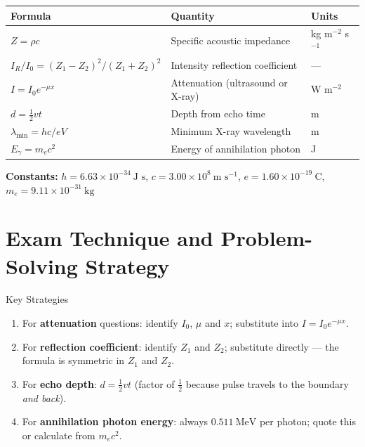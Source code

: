\begin{minipage}{\linewidth}
\begin{tcolorbox}[colback=lightgold, colframe=accentgold]
\renewcommand{\arraystretch}{1.8}
\begin{tabular}{@{}lll@{}}
\toprule
\textbf{Formula} & \textbf{Quantity} & \textbf{Units} \\
\midrule
$Z = \rho c$ & Specific acoustic impedance & kg m$^{-2}$ s$^{-1}$ \\
$I_R/I_0 = (Z_1-Z_2)^2/(Z_1+Z_2)^2$ & Intensity reflection coefficient & --- \\
$I = I_0 e^{-\mu x}$ & Attenuation (ultrasound or X-ray) & W m$^{-2}$ \\
$d = \tfrac{1}{2}vt$ & Depth from echo time & m \\
$\lambda_{\min} = hc/eV$ & Minimum X-ray wavelength & m \\
$E_\gamma = m_e c^2$ & Energy of annihilation photon & J \\
\bottomrule
\end{tabular}
\end{tcolorbox}

\vspace{0.5em}
\begin{tcolorbox}[colback=lightblue, colframe=darkblue]
\textbf{Constants:}\quad
$h = 6.63\times10^{-34}\ \text{J s}$,\quad
$c = 3.00\times10^8\ \text{m s}^{-1}$,\quad
$e = 1.60\times10^{-19}\ \text{C}$,\quad
$m_e = 9.11\times10^{-31}\ \text{kg}$
\end{tcolorbox}
\end{minipage}

\section{Exam Technique and Problem-Solving Strategy}

\begin{keybox}{Key Strategies}
\begin{enumerate}[itemsep=3pt]
  \item For \textbf{attenuation} questions: identify $I_0$, $\mu$ and $x$; substitute into $I = I_0 e^{-\mu x}$.
  \item For \textbf{reflection coefficient}: identify $Z_1$ and $Z_2$; substitute directly — the formula is symmetric in $Z_1$ and $Z_2$.
  \item For \textbf{echo depth}: $d = \tfrac{1}{2}vt$ (factor of $\tfrac{1}{2}$ because pulse travels to the boundary \emph{and back}).
  \item For \textbf{annihilation photon energy}: always $0.511\ \text{MeV}$ per photon; quote this or calculate from $m_e c^2$.
\end{enumerate}
\end{keybox}

